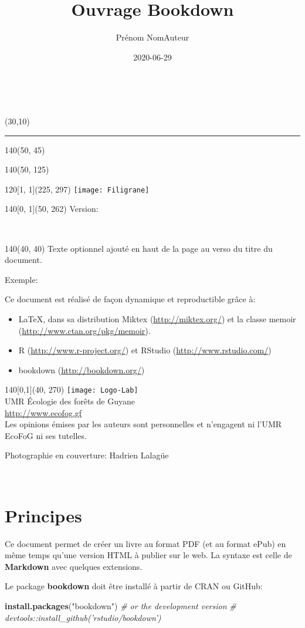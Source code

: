 \documentclass[
  11pt,
  french,
  a4paper,
  extrafontsizes,onecolumn,openright
  ]{memoir}
\title{Ouvrage Bookdown}
\author{Prénom NomAuteur}
\date{2020-06-29}
\newenvironment{Shaded}{\begin{snugshade}}{\end{snugshade}}
\newcommand{\CommentTok}[1]{\textcolor[rgb]{0.56,0.35,0.01}{\textit{#1}}}
\newcommand{\KeywordTok}[1]{\textcolor[rgb]{0.13,0.29,0.53}{\textbf{#1}}}
\newcommand{\NormalTok}[1]{#1}
\newcommand{\StringTok}[1]{\textcolor[rgb]{0.31,0.60,0.02}{#1}}
\newcommand{\MainTitlePage}[1][]{
	\SmallMargins %
	\pagestyle{empty} %
	~\\ %
	\begin{textblock}{2}(30,10)
		\rule{1pt}{\paperheight-20mm}
	\end{textblock}
	\begin{textblock}{140}(50, 45)
		\flushright
		\begin{Spacing}{3}
			{\fontfamily{qtm}\selectfont\fontsize{45}{45}\selectfont \textsc{\thetitle}}
		\end{Spacing}
	\end{textblock}
	\begin{textblock}{140}(50, 125)
		\flushright
		{\fontfamily{qtm}\Large \theauthor}
	\end{textblock}
	\begin{textblock}{120}[1, 1](225, 297)
		\texttt{[image: Filigrane]}
	 \end{textblock}
	\begin{textblock}{140}[0, 1](50, 262)
		\normalfont	Version: \thedate
	\end{textblock}
	\newpage
	~\\ %
	\begin{textblock}{140}(40, 40)
		#1
	\end{textblock}
	\begin{textblock}{140}[0,1](40, 270)
		\centering
    \texttt{[image: Logo-Lab]}\\ \bigskip
		UMR \'Ecologie des forêts de Guyane\\
		\url{http://www.ecofog.gf}\\[3\baselineskip]
		Les opinions émises par les auteurs sont personnelles et n’engagent ni l’UMR EcoFoG ni ses tutelles.

    \tiny{Photographie en couverture: Hadrien Lalagüe}
	\end{textblock}
	\newpage
}
\begin{document}
\frontmatter


\MainTitlePage[Texte optionnel ajouté en haut de la page au verso du titre du document.

Exemple:

Ce document est réalisé de façon dynamique et reproductible grâce à:

\begin{itemize}
  \item \LaTeX, dans sa distribution Miktex (\url{http://miktex.org/}) et la classe memoir (\url{http://www.ctan.org/pkg/memoir}).
  \item R (\url{http://www.r-project.org/}) et RStudio (\url{http://www.rstudio.com/})
  \item bookdown (\url{http://bookdown.org/})
\end{itemize}]

\makeflyleaf
\newpage
~
\newpage









\LargeMargins
{
\hypersetup{linkcolor=}
\setcounter{tocdepth}{3}
\tableofcontents
}



\LargeMargins
\hypertarget{principes}{%
\chapter*{Principes}\label{principes}}

Ce document permet de créer un livre au format PDF (et au format ePub) en même temps qu'une version HTML à publier sur le web.
La syntaxe est celle de \textbf{Markdown} avec quelques extensions.

Le package \textbf{bookdown} doit être installé à partir de CRAN ou GitHub:

\scriptsize

\begin{Shaded}
\begin{Highlighting}[]
\KeywordTok{install.packages}\NormalTok{(}\StringTok{"bookdown"}\NormalTok{)}
\CommentTok{# or the development version}
\CommentTok{# devtools::install_github('rstudio/bookdown')}
\end{Highlighting}
\end{Shaded}
\end{document}
